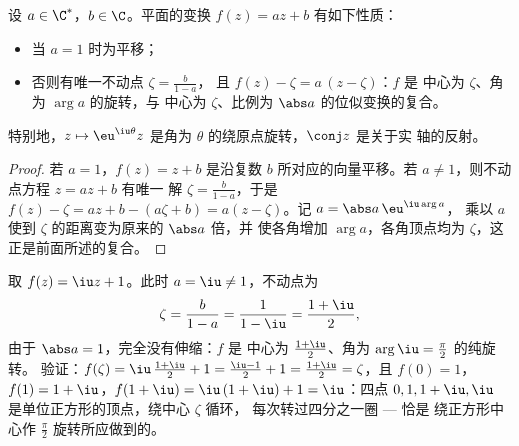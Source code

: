 \begin{proposition}[映射 $z \mapsto az + b$]\label{prop:b1:complex:similitude}
设 $a \in \C^*$，$b \in \C$。平面的变换 $f(z) = az + b$
有如下性质：
\begin{itemize}
  \item 当 $a = 1$ 时为平移；
  \item 否则有唯一不动点 $\zeta = \frac{b}{1-a}$，
        且 $f(z) - \zeta = a\,(z - \zeta)$：$f$ 是
        中心为 $\zeta$、角为 $\arg a$ 的旋转，与
        中心为 $\zeta$、比例为 $\abs a$ 的位似变换的复合。
\end{itemize}
特别地，$z \mapsto \eu^{\iu\theta} z$ 是角为
$\theta$ 的绕原点旋转，$\conj z$ 是关于实
轴的反射。
\end{proposition}

\begin{proof}
若 $a = 1$，$f(z) = z + b$ 是沿复数 $b$ 所对应的向量平移。若
$a \neq 1$，则不动点方程 $z = az + b$ 有唯一
解 $\zeta = \frac{b}{1-a}$，于是 $f(z) - \zeta = az + b -
(a\zeta + b) = a(z - \zeta)$。记 $a = \abs a\, \eu^{\iu\arg a}$，
乘以 $a$ 使到 $\zeta$ 的距离变为原来的 $\abs a$ 倍，并
使各角增加 $\arg a$，各角顶点均为 $\zeta$，这正是前面所述的复合。
\end{proof}

\begin{example}\label{ex:b1:complex:classify}
取 $f(z) = \iu z + 1$。此时 $a = \iu \neq 1$，不动点为
\[
\zeta = \frac{b}{1 - a} = \frac1{1 - \iu}
= \frac{1 + \iu}{2},
\]
由于 $\abs a = 1$，完全没有伸缩：$f$ 是
中心为 $\frac{1+\iu}2$、角为 $\arg \iu = \frac\pi2$ 的纯旋转。
验证：$f(\zeta) = \iu\,\frac{1+\iu}2 + 1 = \frac{\iu - 1}2 + 1 =
\frac{1 + \iu}2 = \zeta$，且 $f(0) = 1$，$f(1) = 1 + \iu$，$f(1 +
\iu) = \iu\,(1 + \iu) + 1 = \iu$：四点 $0, 1, 1+\iu, \iu$
是单位正方形的顶点，绕中心 $\zeta$ 循环，
每次转过四分之一圈 --- 恰是
绕正方形中心作 $\frac\pi2$ 旋转所应做到的。
\end{example}

